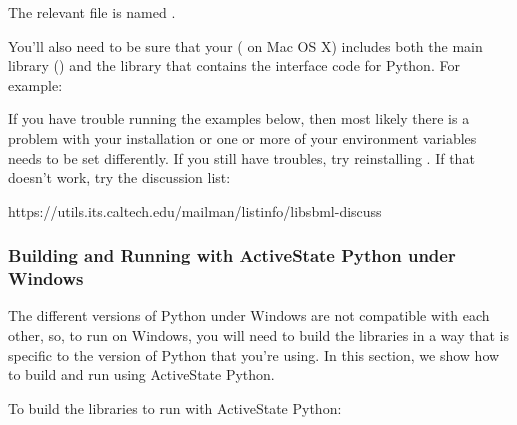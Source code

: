 \documentclass{sbmlmanual}
\begin{document}
The relevant file is named .

You'll also need to be sure that your 
( on Mac OS X) includes both the main
\libsbml{} library () and the  library that
contains the interface code for Python.  For example:


If you have trouble running the examples below, then most
likely there is a problem with your installation or one or
more of your environment variables needs to be set
differently.  If you still have troubles, try reinstalling
\libsbml{}.  If that doesn't work, try the \libsbml{} discussion
list:

\begin{shellVerbatim}
https://utils.its.caltech.edu/mailman/listinfo/libsbml-discuss
\end{shellVerbatim}

\subsubsection{Building and Running with ActiveState Python under Windows}
\label{sec:activestate}

The different versions of Python under Windows are not compatible with each
other, so, to run on Windows, you will need to build the \libsbml{} libraries
in a way that is specific to the version of Python that you're using. In this
section, we show how to build and run \libsbml{} using ActiveState Python.

To build the \libsbml{} libraries to run with ActiveState Python:
\end{document}
